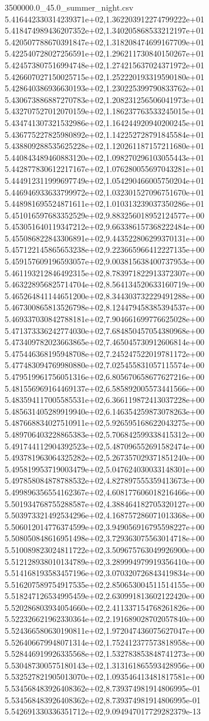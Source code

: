 \begin{filecontents*}{3500000.0_45.0_summer_night.csv}
5.416442330314239371e+02,1.362203912274799222e+01
5.418474989436207352e+02,1.340205868533212197e+01
5.420507788670391847e+02,1.318208474699167709e+01
5.422540728027256591e+02,1.296211730840150267e+01
5.424573807516994748e+02,1.274215637024371972e+01
5.426607027150025715e+02,1.252220193319590180e+01
5.428640386936630193e+02,1.230225399790833762e+01
5.430673886887270783e+02,1.208231256506041973e+01
5.432707527012070159e+02,1.186237763533245015e+01
5.434741307321532986e+02,1.164244920940200245e+01
5.436775227825980892e+02,1.142252728791845584e+01
5.438809288535625228e+02,1.120261187157211680e+01
5.440843489460883120e+02,1.098270296103055443e+01
5.442877830612217167e+02,1.076280055697043281e+01
5.444912311999697749e+02,1.054290466005750204e+01
5.446946933633799972e+02,1.032301527096751670e+01
5.448981695524871611e+02,1.010313239037350286e+01
5.451016597683352529e+02,9.883256018952124577e+00
5.453051640119347212e+02,9.663386157368222484e+00
5.455086822843306891e+02,9.443522806299370131e+00
5.457122145865653238e+02,9.223665966412227135e+00
5.459157609196593057e+02,9.003815638400737953e+00
5.461193212846492315e+02,8.783971822913372307e+00
5.463228956825714704e+02,8.564134520633160719e+00
5.465264841144651200e+02,8.344303732229491288e+00
5.467300865813526798e+02,8.124479458385394537e+00
5.469337030842788181e+02,7.904661699776625028e+00
5.471373336242774030e+02,7.684850457054380968e+00
5.473409782023663865e+02,7.465045730912606814e+00
5.475446368195948708e+02,7.245247522019781172e+00
5.477483094769980880e+02,7.025455831057115574e+00
5.479519961756051316e+02,6.805670658677627216e+00
5.481556969164469137e+02,6.585892005573441566e+00
5.483594117005585531e+02,6.366119872413037228e+00
5.485631405289919940e+02,6.146354259873078263e+00
5.487668834027510911e+02,5.926595168622043275e+00
5.489706403228865383e+02,5.706842599338415312e+00
5.491744112904392523e+02,5.487096552691582474e+00
5.493781963064325282e+02,5.267357029371851240e+00
5.495819953719003479e+02,5.047624030033148301e+00
5.497858084878788532e+02,4.827897555359413673e+00
5.499896356554162367e+02,4.608177606018216466e+00
5.501934768755288587e+02,4.388464182705320127e+00
5.503973321492534296e+02,4.168757286071013368e+00
5.506012014776374599e+02,3.949056916795598227e+00
5.508050848616951498e+02,3.729363075563014718e+00
5.510089823024811722e+02,3.509675763049926900e+00
5.512128938010134789e+02,3.289994979919356410e+00
5.514168193583457196e+02,3.070320726843419834e+00
5.516207589754917535e+02,2.850653004511514155e+00
5.518247126534995459e+02,2.630991813602122420e+00
5.520286803934054660e+02,2.411337154768261826e+00
5.522326621962330364e+02,2.191689028702057840e+00
5.524366580630190811e+02,1.972047436075627047e+00
5.526406679948071314e+02,1.752412377573818958e+00
5.528446919926335568e+02,1.532783853848741273e+00
5.530487300575180143e+02,1.313161865593428956e+00
5.532527821905013070e+02,1.093546413481817581e+00
5.534568483926408362e+02,8.739374981914806995e-01
5.534568483926408362e+02,8.739374981914806995e-01
5.542691330336351712e+02,9.094947017729282379e-13
\end{filecontents*}

